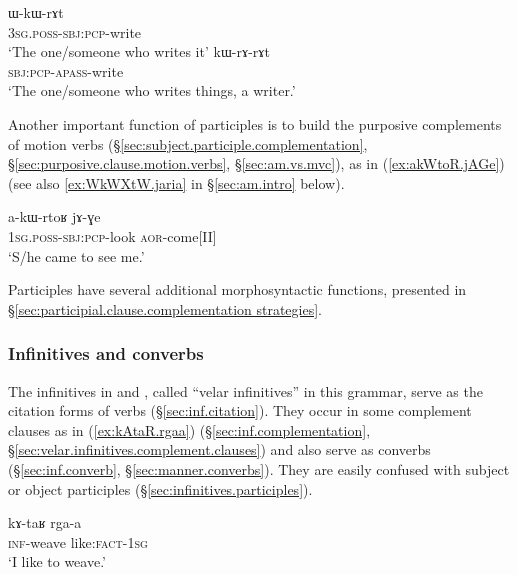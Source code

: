 \begin{exe}
\ex 
\begin{xlist}
\ex \label{ex:WkWrAt.part}
\gll ɯ-kɯ-rɤt \\
\textsc{3sg}.\textsc{poss}-\textsc{sbj}:\textsc{pcp}-write \\
\glt `The one/someone who writes it' 
\ex \label{ex:kWrArAt.part}
\gll kɯ-rɤ-rɤt \\
\textsc{sbj}:\textsc{pcp}-\textsc{apass}-write \\
\glt `The one/someone who writes things, a writer.' 
\end{xlist}
\end{exe}

Another important function of participles is to build the purposive complements of motion verbs (§\ref{sec:subject.participle.complementation}, §\ref{sec:purposive.clause.motion.verbs}, §\ref{sec:am.vs.mvc}), as in  (\ref{ex:akWtoR.jAGe}) (see also \ref{ex:WkWXtW.jaria} in §\ref{sec:am.intro} below).


\begin{exe}
\ex \label{ex:akWtoR.jAGe}
\gll a-kɯ-rtoʁ jɤ-ɣe \\
\textsc{1sg}.\textsc{poss}-\textsc{sbj}:\textsc{pcp}-look \textsc{aor}-come[II] \\
\glt `S/he came to see me.' 
\end{exe}

Participles have several additional morphosyntactic functions, presented in §\ref{sec:participial.clause.complementation strategies}.

\subsubsection{Infinitives and converbs} \label{sec:inf.intro}
The infinitives in  and , called ``velar infinitives'' in this grammar, serve as the citation forms of verbs (§\ref{sec:inf.citation}). They occur in some complement clauses as in (\ref{ex:kAtaR.rgaa}) (§\ref{sec:inf.complementation}, §\ref{sec:velar.infinitives.complement.clauses})  and also serve as converbs (§\ref{sec:inf.converb}, §\ref{sec:manner.converbs}). They are easily confused with subject or object participles (§\ref{sec:infinitives.participles}).

\begin{exe}
\ex \label{ex:kAtaR.rgaa}
\gll kɤ-taʁ rga-a \\
\textsc{inf}-weave like:\textsc{fact}-\textsc{1sg} \\
\glt `I like to weave.' 
\end{exe}

